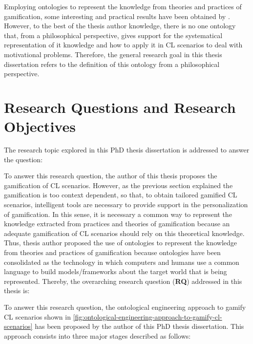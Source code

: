 Employing ontologies to represent the knowledge from theories and practices of gamification, some interesting and practical results have been obtained by .
However, to the best of the thesis author knowledge, there is no one ontology that, from a philosophical perspective, gives support for the systematical representation of it knowledge and how to apply it in CL scenarios to deal with motivational problems.
Therefore, the general research goal in this thesis dissertation refers to the definition of this ontology from a philosophical perspective.



\section{Research Questions and Research Objectives}
\label{sec:research-question-and-research-objectives}

The research topic explored in this PhD thesis dissertation is addressed to answer the question:

To answer this research question, the author of this thesis proposes the gamification of CL scenarios.
However, as the previous section explained the gamification is too context dependent, so that, to obtain tailored gamified CL scenarios, intelligent tools are necessary to provide support in the personalization of gamification. 
In this sense, it is necessary a common way to represent the knowledge extracted from practices and theories of gamification because an adequate gamification of CL scenarios should rely on this theoretical knowledge.
Thus, thesis author proposed the use of ontologies to represent the knowledge from theories and practices of gamification because ontologies have been consolidated as the technology in which computers and humans use a common language to build models/frameworks about the target world that is being represented. 
Thereby, the overarching research question (\textbf{RQ}) addressed in this thesis is: 


To answer this research question, the ontological engineering approach to gamify CL scenarios shown in \autoref{fig:ontological-engineering-approach-to-gamify-cl-scenarios} has been proposed by the author of this PhD thesis dissertation. 
This approach consists into three major stages described as follows:

